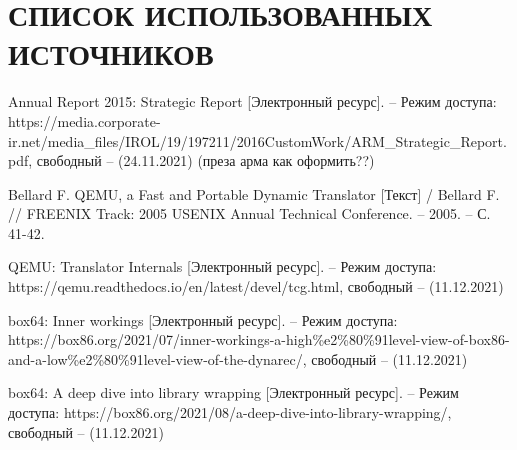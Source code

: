 \section*{СПИСОК ИСПОЛЬЗОВАННЫХ ИСТОЧНИКОВ}

\begingroup
\renewcommand{\section}[2]{}
\begin{thebibliography}{}
	Annual Report 2015: Strategic Report [Электронный ресурс]. – Режим доступа: https://media.corporate-ir.net/media\_files/IROL/19/197211/2016CustomWork/ARM\_Strategic\_Report.pdf,
	свободный – (24.11.2021) (преза арма как оформить??)
	
	Bellard F. QEMU, a Fast and Portable Dynamic Translator [Текст]  / Bellard F. // FREENIX Track: 2005 USENIX Annual Technical Conference. – 2005. – С. 41-42.
	
QEMU: Translator Internals [Электронный ресурс]. – Режим доступа: https://qemu.readthedocs.io/en/latest/devel/tcg.html,
свободный – (11.12.2021)

box64: Inner workings [Электронный ресурс]. – Режим доступа: https://box86.org/2021/07/inner-workings-a-high\%e2\%80\%91level-view-of-box86-and-a-low\%e2\%80\%91level-view-of-the-dynarec/,
свободный – (11.12.2021)

box64: A deep dive into library wrapping [Электронный ресурс]. – Режим доступа: https://box86.org/2021/08/a-deep-dive-into-library-wrapping/,
свободный – (11.12.2021)
\end{thebibliography}
\endgroup

\pagebreak